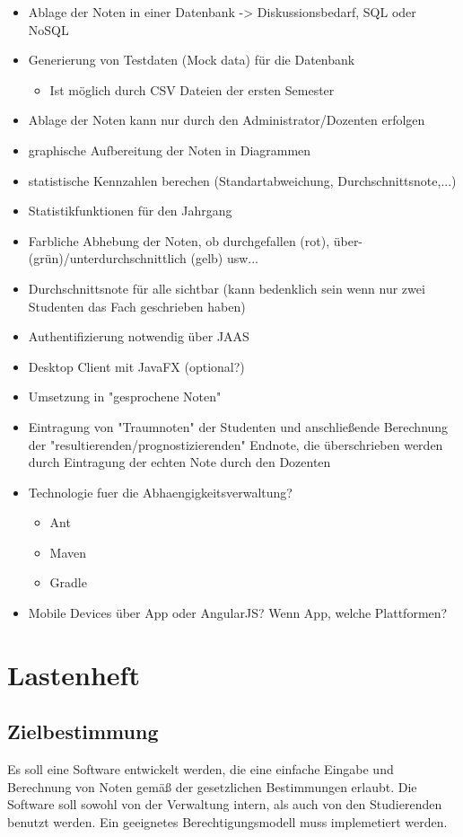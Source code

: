 \documentclass[12pt,a4paper]{scrreprt}
\begin{document}
\begin{itemize}
\item Ablage der Noten in einer Datenbank -> Diskussionsbedarf, SQL oder NoSQL
\item Generierung von Testdaten (Mock data) für die Datenbank
\begin{itemize}
	\item Ist möglich durch CSV Dateien der ersten Semester
\end{itemize}
\item Ablage der Noten kann nur durch den Administrator/Dozenten erfolgen
\item graphische Aufbereitung der Noten in Diagrammen
\item statistische Kennzahlen berechen (Standartabweichung, Durchschnittsnote,...)
\item Statistikfunktionen für den Jahrgang
\item Farbliche Abhebung der Noten, ob durchgefallen (rot), über- (grün)/unterdurchschnittlich (gelb) usw...
\item Durchschnittsnote für alle sichtbar (kann bedenklich sein wenn nur zwei Studenten das Fach geschrieben haben)
\item Authentifizierung notwendig über JAAS
\item Desktop Client mit JavaFX (optional?)
\item Umsetzung in "gesprochene Noten"
\item Eintragung von "Traumnoten" der Studenten und anschließende Berechnung der "resultierenden/prognostizierenden" Endnote, die überschrieben werden durch Eintragung der echten Note durch den Dozenten
\item Technologie fuer die Abhaengigkeitsverwaltung?
\begin{itemize}
\item Ant
\item Maven
\item Gradle
\end{itemize}
\item Mobile Devices über App oder AngularJS? Wenn App, welche Plattformen?
\end{itemize}
\section{Lastenheft}
\subsection{Zielbestimmung}
Es soll eine Software entwickelt werden, die eine einfache Eingabe und Berechnung von Noten gemäß der gesetzlichen Bestimmungen erlaubt. Die Software soll sowohl von der Verwaltung intern, als auch von den Studierenden benutzt werden. Ein geeignetes Berechtigungsmodell muss implemetiert werden.
\end{document}
